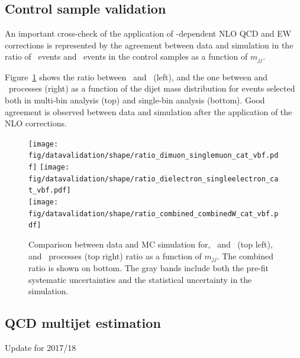 \subsection{Control sample validation}

An important cross-check of the application of \pt-dependent NLO QCD and EW corrections
is represented by the agreement between data and simulation in the ratio of 
\Zjets~events and \Wjets~events in the control samples as a function of $m_{jj}$. 

Figure~\ref{fig:Ratio} shows the ratio between \Zmmjets~and \Wmnjets~(left), 
and the one between \Zeejets and \Wenjets~processes (right) as a function of the dijet mass distribution for 
events selected both in multi-bin analysis (top) and single-bin analysis (bottom).
Good agreement is observed between data and simulation after the application of the NLO corrections. 

\begin{figure}[htbp]
  \centering
  \texttt{[image: fig/datavalidation/shape/ratio\_dimuon\_singlemuon\_cat\_vbf.pdf]}
  \texttt{[image: fig/datavalidation/shape/ratio\_dielectron\_singleelectron\_cat\_vbf.pdf]} \\ 
  \texttt{[image: fig/datavalidation/shape/ratio\_combined\_combinedW\_cat\_vbf.pdf]}
  \caption{Comparison between data and MC simulation for, 
     \Zmmjets~and \Wmnjets~(top left), \Zeejets and \Wenjets~processes (top right) ratio  as a function of $m_{jj}$. The combined ratio is shown on bottom.
     The gray bands include both the pre-fit systematic uncertainties and the statistical 
     uncertainty in the simulation. }
  \label{fig:Ratio}
\end{figure}


\subsection{QCD multijet estimation}
{\color{red} Update for 2017/18}
